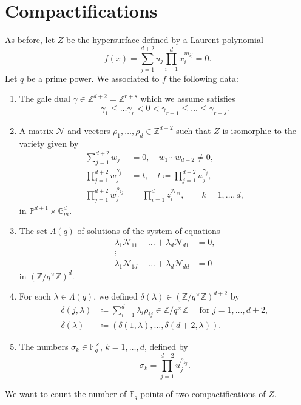 \documentclass[11pt, reqno]{amsart}
\theoremstyle{plain}
\theoremstyle{definition}
\newcommand{\Z}{\mathbb{Z}}
\newcommand{\F}{\mathbb{F}}
\newcommand{\ga}{\gamma}
\newcommand{\G}{\mathbb{G}}
\begin{document}
\section{Compactifications}\label{section:compactifications}
As before, let $Z$ be the hypersurface defined by a Laurent polynomial
\[f(x) =\sum_{j=1}^{d+2} u_j \prod_{i=1}^d x_i^{m_{ij}}=0.\]
Let $q$ be a prime power. 
We associated to $f$ the following data:
\begin{enumerate}
    \item The gale dual $\ga \in \Z ^{d+2} =\Z^{r+s}$ which we assume satisfies 
    \[\ga_1\le \dots\ga_r <0 < \ga_{r+1}\le\dots\le \ga_{r+s}.\]
    \item A matrix $\mathcal{N}$ and vectors $\rho_{1}, \dots, \rho_d \in\Z^{d+2}$ such that $Z$ is isomorphic to the variety given by
    \begin{align*}
    \sum_{j=1}^{d+2} w_j&= 0, \quad  w_1\cdots w_{d+2} \neq 0,\\
        \prod_{j=1}^{d+2} w_j^{\gamma_j} &=t,\quad  t \coloneqq \prod_{j=1}^{d+2} u_j^{\gamma_j},\\
        \prod_{j=1}^{d+2} w_j^{\rho_{kj}} &=  \prod_{i=1}^d z_i^{\mathcal{N}_{ki}},  \qquad k=1,\dots,d,
    \end{align*}
    in $\mathbb{P}^{d+1} \times \G_m^{d}$.
    \item The set $\Lambda(q)$ of solutions of the system of equations \begin{align*}
    \lambda_1 \mathcal{N}_{11}+ \dots +\lambda_d \mathcal{N}_{d1}&=0,\\
    \vdots \\
    \lambda_1 \mathcal{N}_{1d}+ \dots +\lambda_d \mathcal{N}_{dd}&=0
    \end{align*}
    in $(\Z/q^\times\Z)^{d}$.
    \item For each $\lambda \in \Lambda(q)$, we defined $\delta(\lambda) \in \left(\Z/q^\times\Z\right)^{d+2}$ by
    \begin{align*}
        \delta(j,\lambda) &\coloneqq \sum_{i=1}^d \lambda_i \rho_{ij} \in \Z/q^\times\Z \quad \text{ for } j=1,\dots, d+2 ,\\
        \delta(\lambda) &\coloneqq (\delta(1,\lambda),\dots,\delta(d+2,\lambda)) .
    \end{align*}
    \item  The numbers $\sigma_k \in \F_q^\times$, $k=1,\dots,d$, defined by 
    \[
    \sigma_k= \prod_{j=1}^{d+2} u_j^{\rho_{kj}}.
    \]  
\end{enumerate}
We want to count the number of $\F_q$-points of two compactifications of $Z$.
\end{document}
